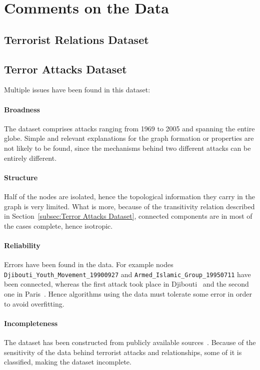 \section{Comments on the Data}
\label{sec:Comments on the Data}

\subsection{Terrorist Relations Dataset}

\subsection{Terror Attacks Dataset}
\label{subsec:terror attack quality}
Multiple issues have been found in this dataset:

\paragraph{Broadness} 
The dataset comprises attacks ranging from 1969 to 2005 and spanning the entire globe. Simple and relevant explanations for the graph formation or properties are not likely to be found, since the mechanisms behind two different attacks can be entirely different.

\paragraph{Structure} 
Half of the nodes are isolated, hence the topological information they carry in the graph is very limited. What is more, because of the transitivity relation described in Section~\ref{subsec:Terror Attacks Dataset}, connected components are in most of the cases complete, hence isotropic. 

\paragraph{Reliability} 
Errors have been found in the data. For example nodes
 \texttt{Djibouti\_Youth\_Movement\_19900927} 
 and 
 \texttt{Armed\_Islamic\_Group\_19950711} 
 have been connected, whereas the first attack took place in Djibouti~\cite{amnesty1991} and the second one in Paris~\cite{nouvelObs2007}. Hence algorithms using the data must tolerate some error in order to avoid overfitting.

\paragraph{Incompleteness}
The dataset has been constructed from publicly available sources~\cite{ZSG2006}. Because of the sensitivity of the data behind terrorist attacks and relationships, some of it is classified, making the dataset incomplete.